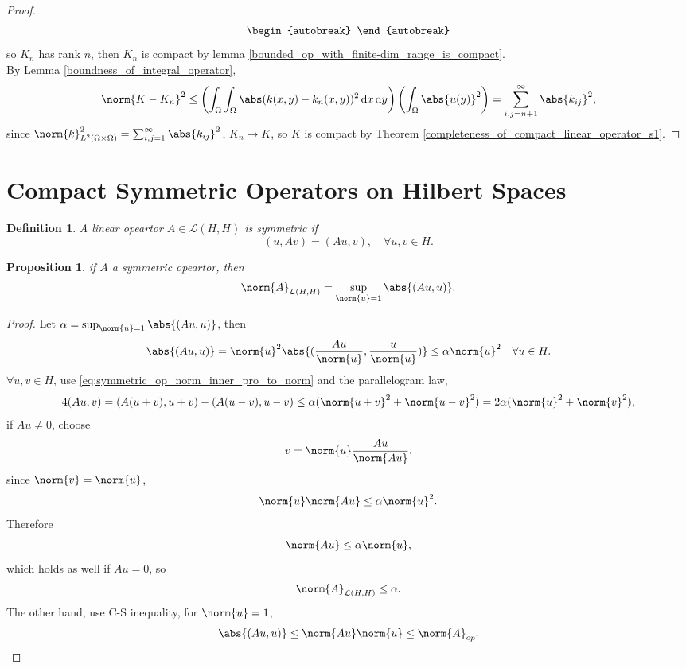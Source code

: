 \documentclass[a4paper]{book}
\newtheorem{defi}[thm]{Definition}
\newtheorem{prop}[thm]{Proposition}
\newcommand\diff{\,\mathrm{d}}
\DeclarePairedDelimiter{\norm}\lVert\rVert
\DeclarePairedDelimiter{\abs}\lvert\rvert
\def\L{\mathcal{L}}
\begin{document}
\begin{proof}
\begin{align*}
\begin{autobreak}
        \end{autobreak}
    \end{align*}
    so $K_n$ has rank $n$, then $K_n$ is compact by lemma \ref{bounded_op_with_finite-dim_range_is_compact}.\\
    By Lemma \ref{boundness_of_integral_operator},
    \begin{align*}
        \norm{K-K_n}^2 \leq \left(\int_{\Omega}\int_{\Omega}\abs(k(x,y)-k_n(x,y))^2 \diff x \diff y\right)\left(\int_{\Omega}\abs{u(y)}^2\right) = \sum_{i,j=n+1}^{\infty}\abs{k_{ij}}^2,
    \end{align*}
    since $\norm{k}_{L^2(\Omega \times \Omega)}^2 = \sum_{i,j=1}^{\infty}\abs{k_{ij}}^2$, $K_n \to K$, so $K$ is compact by Theorem \ref{completeness_of_compact_linear_operator_s1}.
\end{proof}
\section{Compact Symmetric Operators on Hilbert Spaces}
\begin{defi}
    A linear opeartor $A \in \L(H,H)$ is symmetric if
    \[
        (u,Av)=(Au,v), \quad \forall u,v \in H.
    \]
\end{defi}
\begin{prop}
    if $A$ a symmetric opeartor, then
    \begin{equation}\label{eq:symmetric_op_norm_inner_pro_to_norm}
        \norm{A}_{\L(H,H)}=\sup_{\norm{u}=1}\abs{(Au,u)}.
    \end{equation}
\end{prop}
\begin{proof}
    Let $\alpha = \sup_{\norm{u}=1}\abs{(Au,u)}$, then
    \begin{equation}
        \abs{(Au,u)}=\norm{u}^2\abs{(\frac{Au}{\norm{u}},\frac{u}{\norm{u}})} \leq \alpha \norm{u}^2 \quad \forall u \in H.
    \end{equation}
    $\forall u,v \in H$, use \ref{eq:symmetric_op_norm_inner_pro_to_norm} and the parallelogram law,
    \begin{align*}
        4(Au,v)=(A(u+v),u+v)-(A(u-v),u-v)
        \leq \alpha(\norm{u+v}^2+\norm{u-v}^2)
        =2\alpha(\norm{u}^2+\norm{v}^2),
    \end{align*}
    if $Au \neq 0$, choose
    \[ v=\norm{u}\frac{Au}{\norm{Au}}, \]
    since $\norm{v}=\norm{u}$,
    \[ \norm{u}\norm{Au} \leq \alpha \norm{u}^2. \]
    Therefore
    \[ \norm{Au} \leq \alpha \norm{u}, \]
    which holds as well if $Au=0$, so
    \[\norm{A}_{\L(H,H)} \leq \alpha.\]
    The other hand, use C-S inequality, for $\norm{u}=1$,
    \[\abs{(Au,u)} \leq \norm{Au}\norm{u} \leq \norm{A}_{op}. \]
\end{proof}
\end{document}

